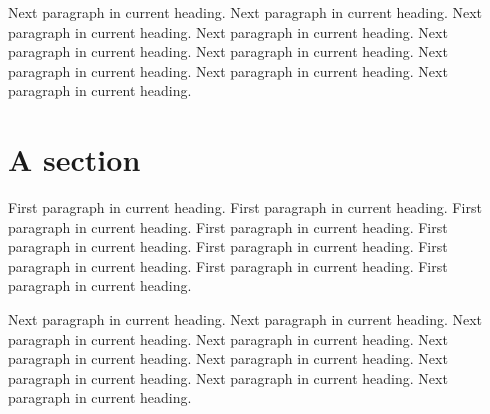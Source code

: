 Next paragraph in current heading. Next paragraph in current heading.
Next paragraph in current heading. Next paragraph in current heading.
Next paragraph in current heading. Next paragraph in current heading.
Next paragraph in current heading. Next paragraph in current heading.
Next paragraph in current heading.

\section{A section}

\noindent   %
First paragraph in current heading. First paragraph in current heading.
First paragraph in current heading. First paragraph in current heading.
First paragraph in current heading. First paragraph in current heading.
First paragraph in current heading. First paragraph in current heading.
First paragraph in current heading.

Next paragraph in current heading. Next paragraph in current heading.
Next paragraph in current heading. Next paragraph in current heading.
Next paragraph in current heading. Next paragraph in current heading.
Next paragraph in current heading. Next paragraph in current heading.
Next paragraph in current heading.

